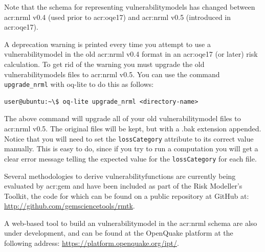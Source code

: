Note that the schema for representing \glspl{vulnerabilitymodel} has changed
between \gls{acr:nrml} v0.4 (used prior to \gls{acr:oqe17}) and \gls{acr:nrml}
v0.5 (introduced in \gls{acr:oqe17}).

A deprecation warning is printed every time you attempt to use a
\gls{vulnerabilitymodel} in the old \gls{acr:nrml} v0.4 format in an
\gls{acr:oqe17} (or later) risk calculation. To get rid of the warning you
must upgrade the old \glspl{vulnerabilitymodel} files to \gls{acr:nrml} v0.5.
You can use the command \Verb+upgrade_nrml+ with oq-lite to do this as
follows:

\begin{verbatim}
user@ubuntu:~\$ oq-lite upgrade_nrml <directory-name>
\end{verbatim}

The above command will upgrade all of your old \gls{vulnerabilitymodel} files to
\gls{acr:nrml} v0.5. The original files will be kept, but with a .bak extension
appended. Notice that you will need to set the \Verb+lossCategory+ attribute
to its correct value manually. This is easy to do, since if you try to run a
computation you will get a clear error message telling the expected value for
the \Verb+lossCategory+ for each file.


Several methodologies to derive \glspl{vulnerabilityfunction} are currently being
evaluated by \gls{acr:gem} and have been included as part of the Risk
Modeller's Toolkit, the code for which can be found on a public repository at
GitHub at: 
\href{http://github.com/gemsciencetools/rmtk}{http://github.com/gemsciencetools/rmtk}.

A web-based tool to build an \gls{vulnerabilitymodel} in the \gls{acr:nrml} schema
are also under development, and can be found at the OpenQuake platform at the
following address: \href{https://platform.openquake.org/ipt/}{https://platform.openquake.org/ipt/}.
